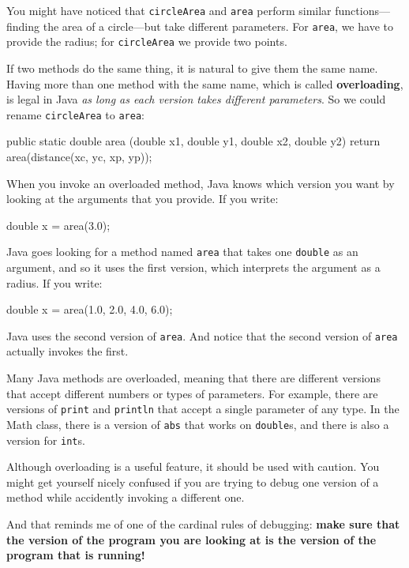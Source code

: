 \documentclass[12pt]{book}
\theoremstyle{exercise}
\begin{document}
You might have noticed that {\tt circleArea} and {\tt area} perform similar functions---finding the area of a circle---but take different parameters.
For {\tt area}, we have to provide the radius; for {\tt circleArea} we provide two points.

If two methods do the same thing, it is natural to give them the same name.
Having more than one method with the same name, which is called {\bf overloading}, is legal in Java {\em as long as each version takes different parameters}.
So we could rename {\tt circleArea} to {\tt area}:

\begin{code}
    public static double area
            (double x1, double y1, double x2, double y2) {
        return area(distance(xc, yc, xp, yp));
    }
\end{code}

When you invoke an overloaded method, Java knows which version you want by looking at the arguments that you provide.
If you write:

\begin{code}
    double x = area(3.0);
\end{code}

Java goes looking for a method named {\tt area} that takes one {\tt double} as an argument, and so it uses the first version, which interprets the argument as a radius.
If you write:

\begin{code}
    double x = area(1.0, 2.0, 4.0, 6.0);
\end{code}

Java uses the second version of {\tt area}.
And notice that the second version of {\tt area} actually invokes the first.

Many Java methods are overloaded, meaning that there are different versions that accept different numbers or types of parameters.
For example, there are versions of {\tt print} and {\tt println} that accept a single parameter of any type.
In the Math class, there is a version of {\tt abs} that works on {\tt double}s, and there is also a version for {\tt int}s.

Although overloading is a useful feature, it should be used with caution.
You might get yourself nicely confused if you are trying to debug one version of a method while accidently invoking a different one.

And that reminds me of one of the cardinal rules of debugging: {\bf make sure that the version of the program you are looking at is the version of the program that is running!}
\end{document}
